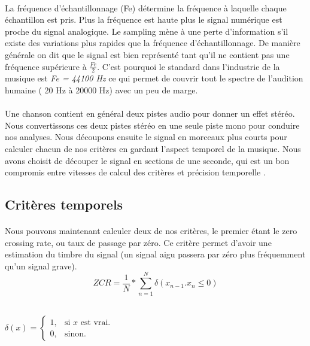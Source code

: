 \documentclass[soumission]{ir}
\begin{document}
\paragraph{}
La fréquence d'échantillonnage (Fe) détermine la fréquence à laquelle chaque échantillon est pris. Plus la 
fréquence est haute plus le signal numérique est proche du signal analogique. Le sampling mène à une  perte 
d’information s’il existe des variations plus rapides que la fréquence d'échantillonnage. De manière 
générale on dit que le signal est bien représenté tant qu’il ne contient pas une fréquence supérieure à 
$\frac{Fe}{2}$. C’est pourquoi le standard dans l’industrie de la musique est \textit{Fe = 44100 Hz} ce qui 
permet de couvrir tout le spectre de l’audition humaine ( 20 Hz à 20000 Hz) avec un peu de marge.

\paragraph{}
Une chanson contient en général deux pistes audio pour donner un effet stéréo. Nous convertissons ces deux pistes 
stéréo en une seule piste mono pour conduire nos analyses. Nous découpons ensuite le signal en morceaux plus
 courts pour calculer chacun de nos critères en gardant l’aspect temporel de la musique. Nous avons choisit 
 de découper le signal en sections de une seconde, qui est un bon compromis entre vitesses de calcul des 
 critères et précision temporelle \cite{Survey}.

\subsection{Critères temporels}
\paragraph{}
Nous pouvons maintenant calculer deux de nos critères, le premier étant le zero crossing rate, ou taux de 
passage par zéro. Ce critère permet d’avoir une estimation du timbre du signal (un signal aigu passera par 
zéro plus fréquemment qu’un signal grave).
\begin{equation}
    ZCR = \frac{1}{N}*\sum_{n = 1}^{N} \delta( x_{n-1}.x_n \leqslant 0 )
\end{equation}

\\

$\delta(x)=\begin{cases}
    1, & \text{si $x$ est vrai}.\\
    0, & \text{sinon}.
\end{cases}$
\end{document}
